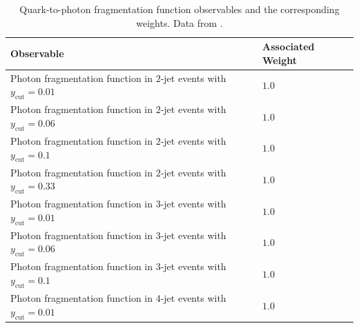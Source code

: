 \documentclass[aps,preprint,floatfix,nofootinbib,showpacs]{revtex4-1}
\begin{document}
\begin{table}[tbp]
 \begin{center}
  \begin{tabular}{ l | l }
\hline \hline
Observable \hspace{1cm}                                                  &  Associated Weight \\ \hline
Photon fragmentation function in $2$-jet events with $y_\text{cut}=0.01$ & \hspace{1cm} $1.0$ \\ \hline
Photon fragmentation function in $2$-jet events with $y_\text{cut}=0.06$ & \hspace{1cm} $1.0$ \\ \hline
Photon fragmentation function in $2$-jet events with $y_\text{cut}=0.1$  & \hspace{1cm} $1.0$ \\ \hline
Photon fragmentation function in $2$-jet events with $y_\text{cut}=0.33$ & \hspace{1cm} $1.0$ \\ \hline
Photon fragmentation function in $3$-jet events with $y_\text{cut}=0.01$ & \hspace{1cm} $1.0$ \\ \hline
Photon fragmentation function in $3$-jet events with $y_\text{cut}=0.06$ & \hspace{1cm} $1.0$ \\ \hline
Photon fragmentation function in $3$-jet events with $y_\text{cut}=0.1$  & \hspace{1cm} $1.0$ \\ \hline
Photon fragmentation function in $4$-jet events with $y_\text{cut}=0.01$ & \hspace{1cm} $1.0$ \\ \hline
\hline
  \end{tabular}
 \end{center}
 \caption{Quark-to-photon fragmentation function observables and the 
 corresponding weights. Data from \cite{Buskulic:1995au}. }
 \label{Tab6}
\end{table}
\end{document}
